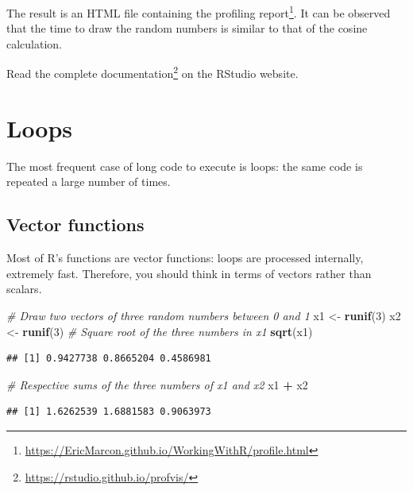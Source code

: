 \documentclass[
  12pt,
  american,
  a4paper,
  extrafontsizes,onecolumn,openright
  ]{memoir}
\newenvironment{Shaded}{\begin{snugshade}}{\end{snugshade}}
\newcommand{\CommentTok}[1]{\textcolor[rgb]{0.56,0.35,0.01}{\textit{#1}}}
\newcommand{\DecValTok}[1]{\textcolor[rgb]{0.00,0.00,0.81}{#1}}
\newcommand{\FunctionTok}[1]{\textcolor[rgb]{0.13,0.29,0.53}{\textbf{#1}}}
\newcommand{\NormalTok}[1]{#1}
\newcommand{\OtherTok}[1]{\textcolor[rgb]{0.56,0.35,0.01}{#1}}
\newcommand{\SpecialCharTok}[1]{\textcolor[rgb]{0.81,0.36,0.00}{\textbf{#1}}}
\begin{document}
\normalsize

The result is an HTML file containing the profiling report\footnote{\url{https://EricMarcon.github.io/WorkingWithR/profile.html}}.
It can be observed that the time to draw the random numbers is similar to that of the cosine calculation.

Read the complete documentation\footnote{\url{https://rstudio.github.io/profvis/}} on the RStudio website.

\section{Loops}\label{loops}

The most frequent case of long code to execute is loops: the same code is repeated a large number of times.

\subsection{Vector functions}\label{vector-functions}

Most of R's functions are vector functions: loops are processed internally, extremely fast.
Therefore, you should think in terms of vectors rather than scalars.

\scriptsize

\begin{Shaded}
\begin{Highlighting}[]
\CommentTok{\# Draw two vectors of three random numbers between 0 and 1}
\NormalTok{x1 }\OtherTok{\textless{}{-}} \FunctionTok{runif}\NormalTok{(}\DecValTok{3}\NormalTok{)}
\NormalTok{x2 }\OtherTok{\textless{}{-}} \FunctionTok{runif}\NormalTok{(}\DecValTok{3}\NormalTok{)}
\CommentTok{\# Square root of the three numbers in x1}
\FunctionTok{sqrt}\NormalTok{(x1)}
\end{Highlighting}
\end{Shaded}

\begin{verbatim}
## [1] 0.9427738 0.8665204 0.4586981
\end{verbatim}

\begin{Shaded}
\begin{Highlighting}[]
\CommentTok{\# Respective sums of the three numbers of x1 and x2}
\NormalTok{x1 }\SpecialCharTok{+}\NormalTok{ x2}
\end{Highlighting}
\end{Shaded}

\begin{verbatim}
## [1] 1.6262539 1.6881583 0.9063973
\end{verbatim}
\end{document}

